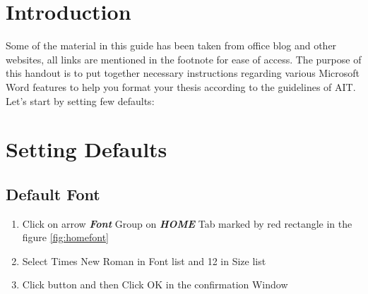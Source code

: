 \section{Introduction}
Some of the material in this guide has been taken from office blog and other websites, all links are mentioned in the footnote for ease of access. The purpose of this handout is to put together necessary instructions regarding various Microsoft Word features to help you format your thesis according to the guidelines of AIT.
Let's start by setting few defaults:
\section{Setting Defaults}
\subsection{Default Font}
\begin{enumerate}
    \item Click on arrow \textbf{\emph{Font}} Group on \textbf{\emph{HOME}} Tab marked by red rectangle in the figure \ref{fig:homefont}
    \item Select Times New Roman in Font list and 12 in Size list 
    \item Click  button and then Click OK in the confirmation Window
\end{enumerate}
